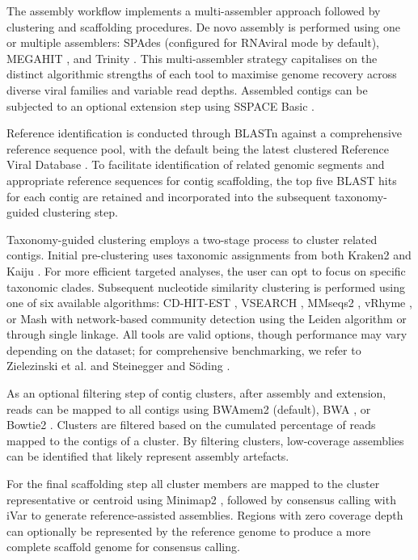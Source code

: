 The assembly workflow implements a multi-assembler approach followed by clustering and scaffolding procedures. De novo assembly is performed using one or multiple assemblers: SPAdes \cite{Meleshko2021-gb} (configured for RNAviral mode by default), MEGAHIT \cite{Li2016-sd}, and Trinity \cite{Grabherr2011-ef}. This multi-assembler strategy capitalises on the distinct algorithmic strengths of each tool to maximise genome recovery across diverse viral families and variable read depths. Assembled contigs can be subjected to an optional extension step using SSPACE Basic \cite{Boetzer2011-dh}.

Reference identification is conducted through BLASTn \cite{Altschul1990-sy} against a comprehensive reference sequence pool, with the default being the latest clustered Reference Viral Database \cite{Goodacre2018-dw}. To facilitate identification of related genomic segments and appropriate reference sequences for contig scaffolding, the top five BLAST hits for each contig are retained and incorporated into the subsequent taxonomy-guided clustering step.

Taxonomy-guided clustering employs a two-stage process to cluster related contigs. Initial pre-clustering uses taxonomic assignments from both Kraken2 \cite{Wood2019-jl} and Kaiju \cite{Menzel2016-tz}. For more efficient targeted analyses, the user can opt to focus on specific taxonomic clades. Subsequent nucleotide similarity clustering is performed using one of six available algorithms: CD-HIT-EST \cite{Li2006-nj}, VSEARCH \cite{Rognes2016-ju}, MMseqs2 \cite{Steinegger2017-ci}, vRhyme \cite{Kieft2022-km}, or Mash \cite{Ondov2019-bo} with network-based community detection using the Leiden algorithm \cite{Traag2019-yd} or through single linkage.  All tools are valid options, though performance may vary depending on the dataset; for comprehensive benchmarking, we refer to Zielezinski et al. \cite{Zielezinski2025-vl} and Steinegger and Söding \cite{Steinegger2017-ci}.

As an optional filtering step of contig clusters, after assembly and extension, reads can be mapped to all contigs using BWAmem2 \cite{Vasimuddin2019-rb} (default), BWA \cite{Li2013-pp}, or Bowtie2 \cite{Langmead2019-wx}. Clusters are filtered based on the cumulated percentage of reads mapped to the contigs of a cluster. By filtering clusters, low-coverage assemblies can be identified that likely represent assembly artefacts.

For the final scaffolding step all cluster members are mapped to the cluster representative or centroid using Minimap2 \cite{Li2018-gi}, followed by consensus calling with iVar \cite{Grubaugh2019-xd} to generate reference-assisted assemblies. Regions with zero coverage depth can optionally be represented by the reference genome to produce a more complete scaffold genome for consensus calling.

